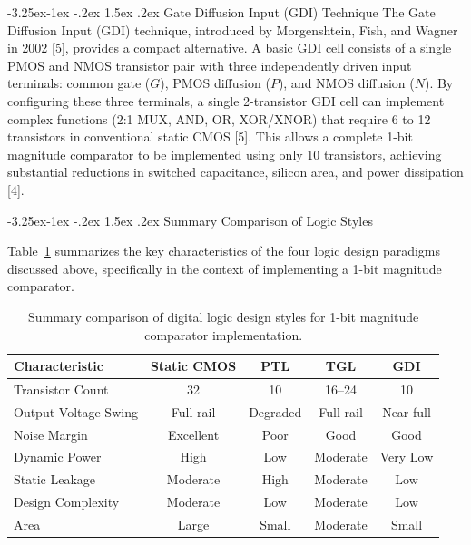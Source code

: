 \documentclass[12pt,a4paper,oneside]{report}
\makeatletter
\renewcommand\subsection{\@startsection{subsection}{2}{\z@}%
                                     {-3.25ex\@plus -1ex \@minus -.2ex}%
                                     {1.5ex \@plus .2ex}%
                                     {\normalfont\normalsize\bfseries\itshape}}
\makeatother
\begin{document}
\subsection{Gate Diffusion Input (GDI) Technique}
The Gate Diffusion Input (GDI) technique, introduced by Morgenshtein, Fish, and Wagner in 2002 [5], provides a compact alternative. A basic GDI cell consists of a single PMOS and NMOS transistor pair with three independently driven input terminals: common gate ($G$), PMOS diffusion ($P$), and NMOS diffusion ($N$). By configuring these three terminals, a single 2-transistor GDI cell can implement complex functions (2:1 MUX, AND, OR, XOR/XNOR) that require 6 to 12 transistors in conventional static CMOS [5]. This allows a complete 1-bit magnitude comparator to be implemented using only 10 transistors, achieving substantial reductions in switched capacitance, silicon area, and power dissipation [4].

\subsection{Summary Comparison of Logic Styles}

Table~\ref{tab:logic_styles_summary} summarizes the key characteristics of the four logic design paradigms discussed above, specifically in the context of implementing a 1-bit magnitude comparator.

\begin{table}[H]
\centering
\caption{Summary comparison of digital logic design styles for 1-bit magnitude comparator implementation.}
\label{tab:logic_styles_summary}
\vspace{0.2cm}
\begin{tabular}{|p{3.2cm}|c|c|c|c|}
\hline
\textbf{Characteristic} & \textbf{Static CMOS} & \textbf{PTL} & \textbf{TGL} & \textbf{GDI} \\
\hline
Transistor Count & 32 & 10 & 16--24 & 10 \\
\hline
Output Voltage Swing & Full rail & Degraded & Full rail & Near full \\
\hline
Noise Margin & Excellent & Poor & Good & Good \\
\hline
Dynamic Power & High & Low & Moderate & Very Low \\
\hline
Static Leakage & Moderate & High & Moderate & Low \\
\hline
Design Complexity & Moderate & Low & Moderate & Low \\
\hline
Area & Large & Small & Moderate & Small \\
\hline
\end{tabular}
\end{table}
\end{document}
